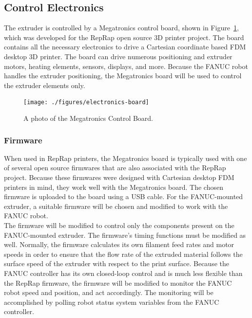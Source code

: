\clearpage




\subsection{Control Electronics}

\indent 

The extruder is controlled by a Megatronics control board, shown in Figure~\ref{fig:megatronics}, which was developed for the RepRap open source 3D printer project. The board contains all the necessary electronics to drive a Cartesian coordinate based FDM desktop 3D printer. The board can drive numerous positioning and extruder motors, heating elements, sensors, displays, and more. Because the FANUC robot handles the extruder positioning, the Megatronics board will be used to control the extruder elements only.\\

\begin{figure}[htp]
\centering
\texttt{[image: ./figures/electronics-board]}
\caption{A photo of the Megatronics Control Board.}
\label{fig:megatronics}
\end{figure}

\subsubsection{Firmware}

\indent

When used in RepRap printers, the Megatronics board is typically used with one of several open source firmwares that are also associated with the RepRap project. Because these firmwares were designed with Cartesian desktop FDM printers in mind, they work well with the Megatronics board. The chosen firmware is uploaded to the board using a USB cable. For the FANUC-mounted extruder, a suitable firmware will be chosen and modified to work with the FANUC robot.\\

The firmware will be modified to control only the components present on the FANUC-mounted extruder. The firmware's timing functions must be modified as well. Normally, the firmware calculates its own filament feed rates and motor speeds in order to ensure that the flow rate of the extruded material follows the surface speed of the extruder with respect to the print surface. Because the FANUC controller has its own closed-loop control and is much less flexible than the RepRap firmware, the firmware will be modified to monitor the FANUC robot speed and position, and act accordingly. The monitoring will be accomplished by polling robot status system variables from the FANUC controller.

